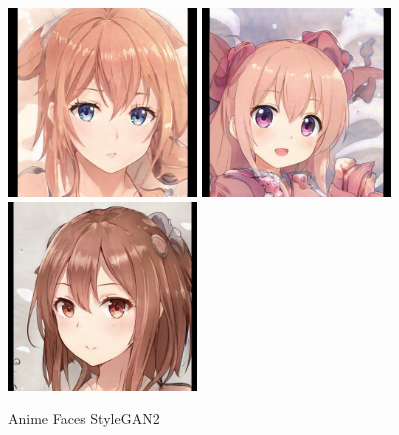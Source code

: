 \begin{figure}
    \centering
    \includegraphics[height=50mm, width=.3\textwidth]{fig/anime_girl_seed0025.png}\hfill
    \includegraphics[height=50mm, width=.3\textwidth]{fig/anime_girl_seed0090.png}\hfill
    \includegraphics[height=50mm, width=.3\textwidth]{fig/anime_girl_seed0100.png}
    \caption{Anime Faces StyleGAN2}
    \label{fig.anime_girls_stylegan2}
\end{figure}

